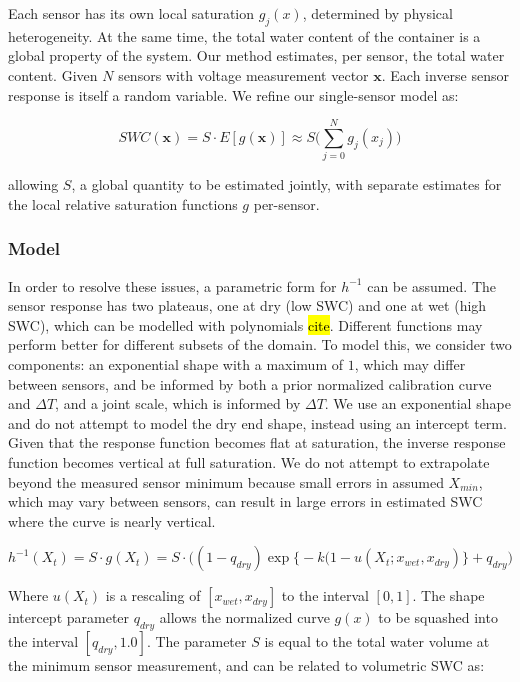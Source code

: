 \documentclass[11pt]{article}
\begin{document}
Each sensor has its own local saturation $g_j(x)$, determined by physical heterogeneity. At the same time, the total water content of the container is a global property of the system. Our method estimates, per sensor, the total water content. Given $N$ sensors with voltage measurement vector $\mathbf{x}$. Each inverse sensor response is itself a random variable. We refine our single-sensor model as:

\begin{equation}
SWC(\mathbf{x}) = S \cdot E[g(\mathbf{x})] \approx S \Big(\sum_{j=0}^N g_j(x_j) \Big)
\end{equation}

allowing $S$, a global quantity to be estimated jointly, with separate estimates for the local relative saturation functions $g$ per-sensor.

\subsubsection{Model}

In order to resolve these issues, a parametric form for $h^{-1}$ can be assumed. The sensor response has two plateaus, one at dry (low SWC) and one at wet (high SWC), which can be modelled with polynomials \hl{cite}. Different functions may perform better for different subsets of the domain. To model this, we consider two components: an exponential shape with a maximum of $1$, which may differ between sensors, and be informed by both a prior normalized calibration curve and $\Delta T$, and a joint scale, which is informed by $\Delta T$. We use an exponential shape and do not attempt to model the dry end shape, instead using an intercept term. Given that the response function becomes flat at saturation, the inverse response function becomes vertical at full saturation. We do not attempt to extrapolate beyond the measured sensor minimum because small errors in assumed $X_{min}$, which may vary between sensors, can result in large errors in estimated SWC where the curve is nearly vertical. 

\begin{equation}
h^{-1}(X_t) = S \cdot g(X_t) = S \cdot \Big((1-q_{dry})\exp\Big\{-k (1 - u(X_t; x_{wet}, x_{dry})\Big\} + q_{dry}\Big)
\end{equation}

Where $u(X_t)$ is a rescaling of $[x_{wet}, x_{dry}]$ to the interval $[0, 1]$. The shape intercept parameter $q_{dry}$ allows the normalized curve $g(x)$ to be squashed into the interval $[q_{dry}, 1.0]$. The parameter $S$ is equal to the total water volume at the minimum sensor measurement, and can be related to volumetric SWC as:\\
\end{document}
